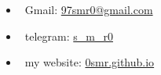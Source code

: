     \begin{itemize}[nosep]
        \item \textcolor{gmail}{\faAt}\ Gmail: \href{mailto:97smr0@gmail.com} {97smr0@gmail.com}
        \item \textcolor{telegram}{\faSendO}\ telegram: \href{tg://resolve?domain=s\_m\_r0}{\faAt s\_m\_r0}
        \item \textcolor{edge}{\faEdge}\ my website: \href{https://0smr.github.io/#contactMe}{0smr.github.io}
    \end{itemize}


